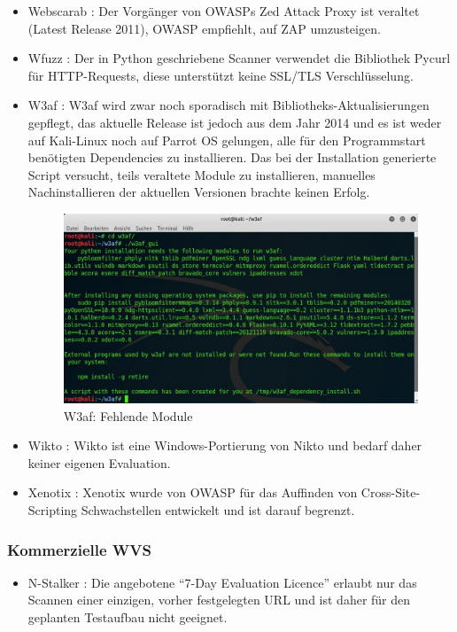 \documentclass[12pt,oneside,a4paper,parskip]{scrbook}
\begin{document}
\begin{itemize}
      \item Webscarab \cite{Webscarab}: Der Vorgänger von OWASPs Zed Attack Proxy ist veraltet (Latest Release 2011), OWASP empfiehlt, auf ZAP umzusteigen.
      \item Wfuzz \cite{Wfuzz}: Der in Python geschriebene Scanner verwendet die Bibliothek Pycurl für HTTP-Requests, diese unterstützt keine SSL/TLS Verschlüsselung.
      \item W3af \cite{W3af}: W3af wird zwar noch sporadisch mit Bibliotheks-Aktualisierungen gepflegt, das aktuelle Release ist jedoch aus dem Jahr 2014 und es ist weder auf Kali-Linux noch auf Parrot OS gelungen, alle für den Programmstart benötigten Dependencies zu installieren. Das bei der Installation generierte Script versucht, teils veraltete Module zu installieren, manuelles Nachinstallieren der aktuellen Versionen brachte keinen Erfolg.
      \begin{figure}[H]
        \includegraphics[width=1\textwidth]{Images/w3af}
        \caption[W3af: Fehlende Module]{W3af: Fehlende Module}
      \end{figure}
      \item Wikto \cite{Wikto}: Wikto ist eine Windows-Portierung von Nikto und bedarf daher keiner eigenen Evaluation.
      \item Xenotix \cite{Xenotix}: Xenotix wurde von OWASP für das Auffinden von Cross-Site-Scripting Schwachstellen entwickelt und ist darauf begrenzt.
    \end{itemize}
    \subsubsection{Kommerzielle WVS}
      \begin{itemize}
        \item N-Stalker \cite{Stalker}: Die angebotene ``7-Day Evaluation Licence'' erlaubt nur das Scannen einer einzigen, vorher festgelegten URL und ist daher für den geplanten Testaufbau nicht geeignet.
      \end{itemize}
\end{document}
